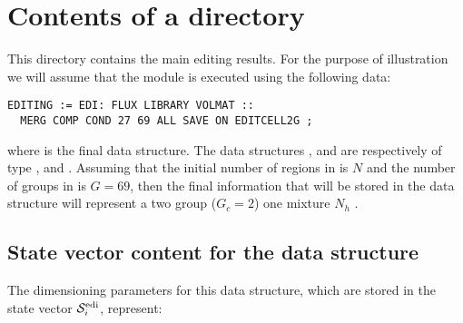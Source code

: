 \section{Contents of a  directory}\label{sect:editiondir}

This directory contains the main editing results. For the purpose of illustration
we will assume that the  module is executed using the following data:

\vskip -0.1cm
\begin{verbatim}
EDITING := EDI: FLUX LIBRARY VOLMAT ::
  MERG COMP COND 27 69 ALL SAVE ON EDITCELL2G ;
\end{verbatim}
\vskip -0.1cm

\noindent
where  is the final  data structure. The data structures ,
 and  are respectively of type ,  and
. Assuming that the initial number of regions in  is $N$ and the number of
groups in  is $G=69$, then the final information that will be stored in
the  data structure will represent a two group ($G_{c}=2$) one mixture
$N_{h}$ . 

\subsection{State vector content for the  data structure}\label{sect:editionstate}

The dimensioning parameters for this data structure, which are stored in the state vector
$\mathcal{S}^{\rm edi}_{i}$, represent:

